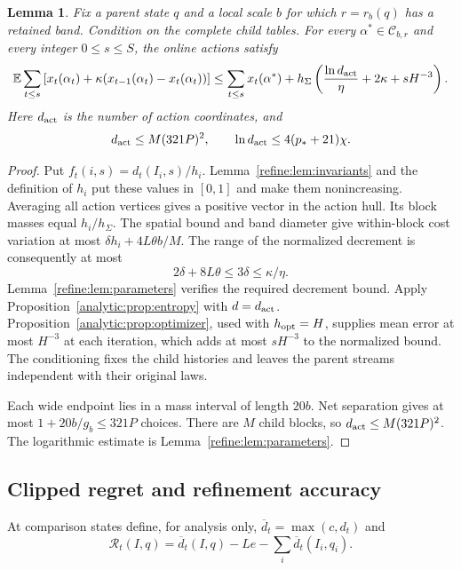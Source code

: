 \documentclass[11pt]{article}
\newtheorem{lemma}[theorem]{Lemma}
\theoremstyle{definition}
\newcommand{\E}{\mathbb E}
\newcommand{\cC}{\mathcal C}
\newcommand{\1}{\mathbf 1}
\begin{document}
\begin{lemma}\label{refine:lem:online}
Fix a parent state $q$ and a local scale $b$ for which $r=r_b(q)$ has
a retained band. Condition on the complete child tables.
For every $\alpha^*\in\cC_{b,r}$ and every integer $0\le s\le S$,
the online actions satisfy
\[
 \E\sum_{t\le s}\left[
 x_t(\alpha_t)+\kappa(x_{t-1}(\alpha_t)-x_t(\alpha_t))\right]
 \le\sum_{t\le s}x_t(\alpha^*)+
 h_\Sigma\left(\frac{\ln d_{\rm act}}{\eta}+2\kappa+sH^{-3}\right).
\]
Here $d_{\rm act}$ is the number of action coordinates, and
\[
 d_{\rm act}\le M(321P)^2,\qquad \ln d_{\rm act}\le4(p_*+21)\chi.
\]
\end{lemma}
\begin{proof}
Put $f_t(i,s)=d_t(I_i,s)/h_i$.
Lemma~\ref{refine:lem:invariants} and the definition of $h_i$ put these
values in $[0,1]$ and make them nonincreasing.
Averaging all action vertices gives a positive vector in the action hull.
Its block masses equal $h_i/h_\Sigma$.
The spatial bound and band diameter give within-block cost variation
at most $\delta h_i+4L\theta b/M$.
The range of the normalized decrement is consequently at most
\[
 2\delta+8L\theta\le3\delta\le\kappa/\eta.
\]
Lemma~\ref{refine:lem:parameters} verifies the required decrement bound.
Apply Proposition~\ref{analytic:prop:entropy} with $d=d_{\rm act}$.
Proposition~\ref{analytic:prop:optimizer}, used with $h_{\rm opt}=H$,
supplies mean error at most
$H^{-3}$ at each iteration, which adds at most $sH^{-3}$ to the
normalized bound.
The conditioning fixes the child histories and leaves the parent
streams independent with their original laws.

Each wide endpoint lies in a mass interval of length $20b$.
Net separation gives at most $1+20b/g_b\le321P$ choices.
There are $M$ child blocks, so $d_{\rm act}\le M(321P)^2$.
The logarithmic estimate is Lemma~\ref{refine:lem:parameters}.
\end{proof}

\subsection{Clipped regret and refinement accuracy}

At comparison states define, for analysis only, $\overline d_t=\max(c,d_t)$ and
\[
 \mathcal R_t(I,q)=\overline d_t(I,q)-Le-\sum_i\overline d_t(I_i,q_i).
\]
\end{document}
